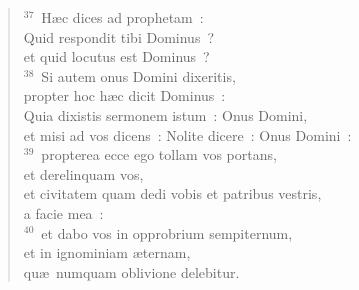 \begin{verse}
${}^{37}$~H\ae c dices ad prophetam~:\\ Quid respondit tibi Dominus~?\\ et quid locutus est Dominus~?\\
${}^{38}$~Si autem onus Domini dixeritis,\\ propter hoc h\ae c dicit Dominus~:\\ Quia dixistis sermonem istum~: Onus Domini,\\ et misi ad vos dicens~: Nolite dicere~: Onus Domini~:\\
${}^{39}$~propterea ecce ego tollam vos portans,\\ et derelinquam vos,\\ et civitatem quam dedi vobis et patribus vestris,\\ a facie mea~:\\
${}^{40}$~et dabo vos in opprobrium sempiternum,\\ et in ignominiam \ae ternam,\\ qu\ae\ numquam oblivione delebitur.\end{verse}



